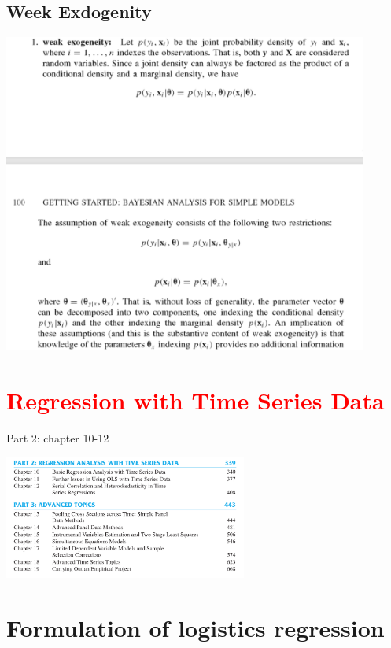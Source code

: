 \documentclass[a4paper,10pt]{article}
\newcommand{\red}[1]{\textcolor{red}{#1}}
\begin{document}
\subsection{Week Exdogenity \cite{jackman2009bayesian}}
\includegraphics[width=12cm]{3.png}\\





\section{\red{Regression with Time Series Data \cite{wooldridge2015introductory}}}

Part 2: chapter 10-12\\


\begin{center}
\includegraphics[width=8cm]{10.png}
\end{center}



\section{Formulation of logistics regression}
\end{document}
